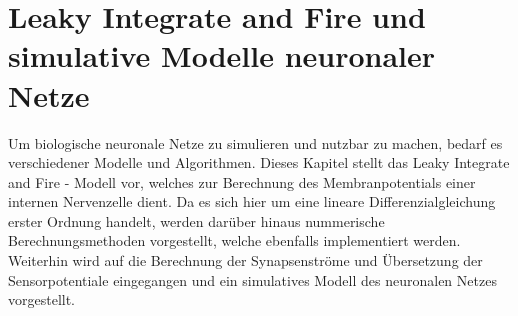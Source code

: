 %
\chapter{Leaky Integrate and Fire und simulative Modelle neuronaler Netze}
\label{chap:lif}
%

	Um biologische neuronale Netze zu simulieren und nutzbar zu machen, bedarf es verschiedener Modelle und Algorithmen. Dieses Kapitel stellt das Leaky Integrate and Fire - Modell vor, welches zur Berechnung des Membranpotentials einer internen Nervenzelle dient. Da es sich hier um eine lineare Differenzialgleichung erster Ordnung handelt, werden darüber hinaus nummerische Berechnungsmethoden vorgestellt, welche ebenfalls implementiert werden. Weiterhin wird auf die Berechnung der Synapsenströme und Übersetzung der Sensorpotentiale eingegangen und ein simulatives Modell des neuronalen Netzes vorgestellt.


